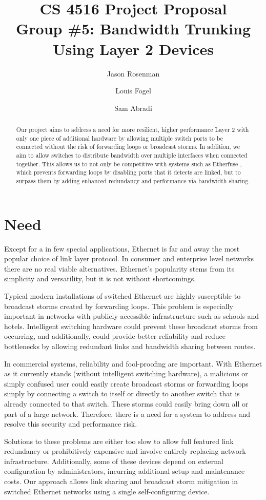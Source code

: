 \documentclass{article}
\title{CS 4516 Project Proposal\\Group \#5: Bandwidth Trunking Using Layer 2 Devices}
\author{Jason Rosenman \and Louis Fogel \and Sam Abradi}
\date{}
\begin{document}
\maketitle
\begin{abstract}
	Our project aims to address a need for more resilient, higher performance Layer 2 with only one piece of additional hardware by allowing multiple switch ports to be connected without the risk of forwarding loops or broadcast storms.
	In addition, we aim to allow switches to distribute bandwidth over multiple interfaces when connected together.
	This allows us to not only be competitive with systems such as Etherfuse \cite{etherfuse}, which prevents forwarding loops by disabling ports that it detects are linked, but to surpass them by adding enhanced redundancy and performance via bandwidth sharing.
\end{abstract}
\section{Need}
	Except for a in few special applications, Ethernet is far and away the most popular choice of link layer protocol.
	In consumer and enterprise level networks there are no real viable alternatives.
	Ethernet’s popularity stems from its simplicity and versatility, but it is not without shortcomings.

	Typical modern installations of switched Ethernet are highly susceptible to broadcast storms created by forwarding loops.
	This problem is especially important in networks with publicly accessible infrastructure such as schools and hotels.
	Intelligent switching hardware could prevent these broadcast storms from occurring, and additionally, could provide better reliability and reduce bottlenecks by allowing redundant links and bandwidth sharing between routes.
	
	In commercial systems, reliability and fool-proofing are important.
	With Ethernet as it currently stands (without intelligent switching hardware), a malicious or simply confused user could easily create broadcast storms or forwarding loops simply by connecting a switch to itself or directly to another switch that is already connected to that switch.
	These storms could easily bring down all or part of a large network.
	Therefore, there is a need for a system to address and resolve this security and performance risk.
	
	Solutions to these problems are either too slow to allow full featured link redundancy or prohibitively expensive and involve entirely replacing network infrastructure.
	Additionally, some of these devices depend on external configuration by administrators, incurring additional setup  and maintenance costs.
	Our approach allows link sharing and broadcast storm mitigation in switched Ethernet networks using a single self-configuring device.
\end{document}
